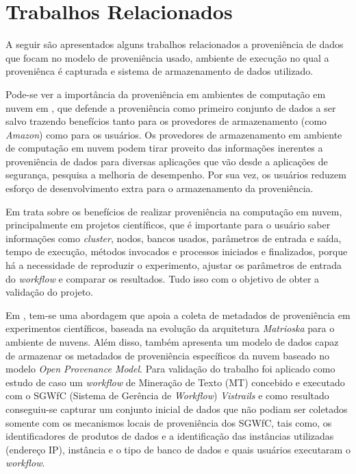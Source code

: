 \section{Trabalhos Relacionados}

A seguir são apresentados alguns trabalhos relacionados a proveniência de dados que focam no modelo de proveniência usado, ambiente de execução no qual a proveniênca é capturada e sistema de armazenamento de dados utilizado.

Pode-se ver a importância da proveniência em ambientes de computação em nuvem em \cite{kiran}, que  defende a proveniência como primeiro conjunto de dados a ser salvo trazendo benefícios tanto para os provedores de armazenamento (como \textit{Amazon}) como para os usuários. Os provedores de armazenamento em ambiente de computação em nuvem podem tirar proveito das informações inerentes a proveniência de dados para diversas aplicações que vão desde a aplicações de segurança, pesquisa a melhoria de desempenho. Por sua vez, os usuários reduzem esforço de desenvolvimento extra para o armazenamento da proveniência.

Em \cite{muniswamy} trata sobre os benefícios de realizar proveniência na computação em nuvem, principalmente em projetos científicos, que é importante para o usuário saber informações como \textit{cluster}, nodos, bancos usados, parâmetros de entrada e saída, tempo de execução, métodos invocados e processos iniciados e finalizados, porque há a necessidade de reproduzir o experimento, ajustar os parâmetros de entrada do \textit{workflow} e comparar os resultados. Tudo isso com o objetivo de obter a validação do projeto.

Em \cite{paulino}, tem-se uma abordagem que apoia a coleta de metadados de proveniência em experimentos científicos, baseada na evolução da arquitetura \textit{Matrioska} para o ambiente de nuvens. Além disso, também apresenta um modelo de dados capaz de armazenar os metadados de proveniência específicos da nuvem baseado no modelo \textit{Open Provenance Model}. Para validação do trabalho foi aplicado como estudo de caso um \textit{workflow} de Mineração de Texto (MT) concebido e executado com o SGWfC (Sistema de Gerência de \textit{Workflow}) \textit{Vistrails} e como resultado conseguiu-se capturar um conjunto inicial de dados que não podiam ser coletados somente com os mecanismos locais de proveniência dos SGWfC, tais como, os identificadores de produtos de dados e a identificação das instâncias utilizadas (endereço IP), instância e o tipo de banco de dados e quais usuários executaram o \textit{workflow}.

